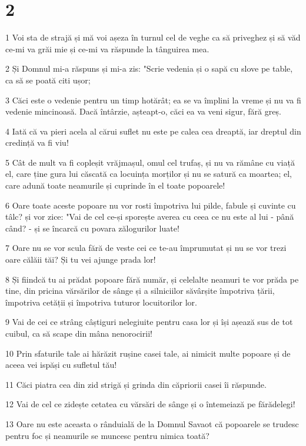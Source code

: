 \chapter{2}

\par 1 Voi sta de strajă și mă voi așeza în turnul cel de veghe ca să priveghez și să văd ce-mi va grăi mie și ce-mi va răspunde la tânguirea mea.
\par 2 Și Domnul mi-a răspuns și mi-a zis: "Scrie vedenia și o sapă cu slove pe table, ca să se poată citi ușor;
\par 3 Căci este o vedenie pentru un timp hotărât; ea se va împlini la vreme și nu va fi vedenie mincinoasă. Dacă întârzie, așteapt-o, căci ea va veni sigur, fără greș.
\par 4 Iată că va pieri acela al cărui suflet nu este pe calea cea dreaptă, iar dreptul din credință va fi viu!
\par 5 Cât de mult va fi copleșit vrăjmașul, omul cel trufaș, și nu va rămâne cu viață el, care ține gura lui căscată ca locuința morților și nu se satură ca moartea; el, care adună toate neamurile și cuprinde în el toate popoarele!
\par 6 Oare toate aceste popoare nu vor rosti împotriva lui pilde, fabule și cuvinte cu tâlc? și vor zice: "Vai de cel ce-și sporește averea cu ceea ce nu este al lui - până când? - și se încarcă cu povara zălogurilor luate!
\par 7 Oare nu se vor scula fără de veste cei ce te-au împrumutat și nu se vor trezi oare călăii tăi? Și tu vei ajunge prada lor!
\par 8 Și fiindcă tu ai prădat popoare fără număr, și celelalte neamuri te vor prăda pe tine, din pricina vărsărilor de sânge și a silniciilor săvârșite împotriva țării, împotriva cetății și împotriva tuturor locuitorilor lor.
\par 9 Vai de cei ce strâng câștiguri nelegiuite pentru casa lor și își așează sus de tot cuibul, ca să scape din mâna nenorocirii!
\par 10 Prin sfaturile tale ai hărăzit rușine casei tale, ai nimicit multe popoare și de aceea vei ispăși cu sufletul tău!
\par 11 Căci piatra cea din zid strigă și grinda din căpriorii casei îi răspunde.
\par 12 Vai de cel ce zidește cetatea cu vărsări de sânge și o întemeiază pe fărădelegi!
\par 13 Oare nu este aceasta o rânduială de la Domnul Savaot că popoarele se trudesc pentru foc și neamurile se muncesc pentru nimica toată?

